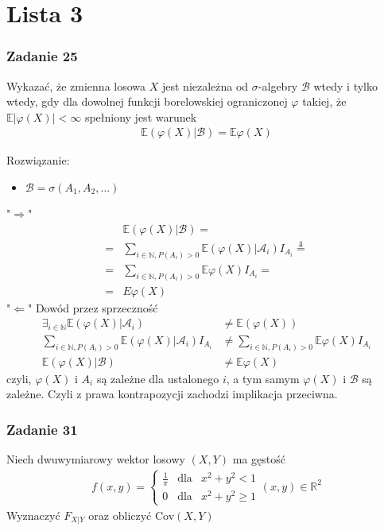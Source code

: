 \chapter*{Lista 3}


\subsection*{Zadanie 25}
Wykazać, że zmienna losowa $ X $ jest niezależna od $ \sigma $-algebry $ \mathcal B $ wtedy i tylko wtedy, gdy dla dowolnej funkcji borelowskiej ograniczonej $ \varphi $ takiej, że $ \mathbb E \left|\varphi(X)\right|<\infty  $ spełniony jest warunek
\begin{gather*}
\mathbb E \left(\varphi(X)|\mathcal B\right)=\mathbb E \varphi(X)
\end{gather*}

Rozwiązanie:
\begin{itemize}
\item $ \mathcal B=\sigma\left(A_1,A_2,\dots\right) $
\end{itemize}
"$ \Rightarrow $"
\begin{align*}
&\mathbb E \left(\varphi(X)|\mathcal B\right)
=\\=&
\sum_{i\in \mathbb N ,P\left(A_i\right)>0}
\mathbb E \left(\varphi(X)|\mathcal A_i\right)I_{A_i}
\stackrel{\Perp}{=}\\=&
\sum_{i\in \mathbb N ,P\left(A_i\right)>0}
\mathbb E \varphi(X)I_{A_i}
=\\=&
E\varphi(X)
\end{align*}
"$ \Leftarrow $" Dowód przez sprzeczność
\begin{align*}
\exists_{i\in \mathbb N }\mathbb E \left(\varphi(X)|\mathcal A_i\right)&\neq\mathbb E \left(\varphi(X)\right)\\
\sum_{i\in \mathbb N ,P\left(A_i\right)>0}
\mathbb E \left(\varphi(X)|\mathcal A_i\right)I_{A_i}&\neq
\sum_{i\in \mathbb N ,P\left(A_i\right)>0}
\mathbb E \varphi(X)I_{A_i}\\
\mathbb E \left(\varphi(X)|\mathcal B\right)&\neq
\mathbb E \varphi(X)
\end{align*}
czyli, $ \varphi(X) $ i $ A_i $ są zależne dla ustalonego $ i $, a tym samym $ \varphi(X) $ i $ \mathcal B $ są zależne. Czyli z prawa kontrapozycji zachodzi implikacja przeciwna.


\subsection*{Zadanie 31}
Niech dwuwymiarowy wektor losowy $ (X,Y) $ ma gęstość
\begin{gather*}
f(x,y)=\left \{
\begin{array}{lll}
	\frac{1}{\pi} & \text{dla} & x^2+y^2<1   \\
	0             & \text{dla} & x^2+y^2\ge1
\end{array}
\right .
(x,y)\in \mathbb R ^2
\end{gather*}
Wyznaczyć $ F_{X|Y} $ oraz obliczyć Cov$ (X,Y) $

